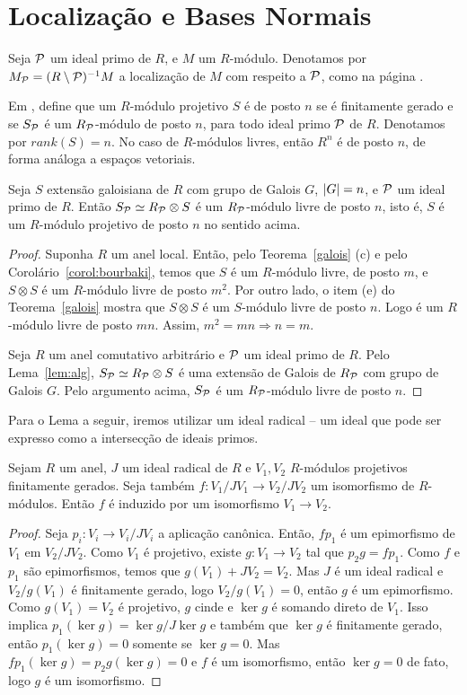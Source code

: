 \section{Localização e Bases Normais} \label{sec:local}
Seja $\mathcal{P}$ um ideal primo de $R$, e $M$ um $R$-módulo. Denotamos por $M_{\mathcal{P}} = (R\setminus \mathcal{P})^{-1}M$ a localização de $M$ com respeito a $\mathcal{P}$, como na página \pageref{localiza}. \par 
Em \cite{bourbaki}, \citeauthor{bourbaki} define que um $R$-módulo projetivo $S$ é de posto $n$ se é finitamente gerado e se $S_{\mathcal{P}}$ é um $R_{\mathcal{P}}$-módulo de posto $n$, para todo ideal primo $\mathcal{P}$ de $R$. Denotamos por $rank(S)=n$. No caso de $R$-módulos livres, então $R^n$ é de posto $n$, de forma análoga a espaços vetoriais.
\begin{lemma} \label{lem:local}
Seja $S$ extensão galoisiana de $R$ com grupo de Galois $G$, $\left| G \right|=n$, e $\mathcal{P}$ um ideal primo de $R$. Então $S_{\mathcal{P}} \simeq R_{\mathcal{P}} \otimes S$ é um $R_{\mathcal{P}}$-módulo livre de posto $n$, isto é, $S$ é um $R$-módulo projetivo de posto $n$ no sentido acima.
\begin{proof}
Suponha $R$ um anel local. Então, pelo Teorema~\ref{galois} (c) e pelo Corolário~\ref{corol:bourbaki}, temos que $S$ é um $R$-módulo livre, de posto $m$, e $S\otimes S$ é um $R$-módulo livre de posto $m^2$.
Por outro lado, o item (e) do Teorema~\ref{galois} mostra que $S\otimes S$ é um $S$-módulo livre de posto $n$. Logo é um $R$-módulo livre de posto $mn$. Assim, $m^2=mn \Rightarrow n=m$. \par
Seja $R$ um anel comutativo arbitrário e $\mathcal{P}$ um ideal primo de $R$. Pelo Lema~\ref{lem:alg}, $S_{\mathcal{P}} \simeq R_{\mathcal{P}} \otimes S$ é uma extensão de Galois de $R_{\mathcal{P}}$ com grupo de Galois $G$. Pelo argumento acima, $S_{\mathcal{P}}$ é um $R_{\mathcal{P}}$-módulo livre de posto $n$.
\end{proof}
\end{lemma}
Para o Lema a seguir, iremos utilizar um ideal radical -- um ideal que pode ser expresso como a intersecção de ideais primos.
\begin{lemma}\label{lem:isoindu}\cite[Lemma 3.14.]{zelinsky}
Sejam $R$ um anel, $J$ um ideal radical de $R$ e $V_1, V_2$ $R$-módulos projetivos finitamente gerados. Seja também $f: V_1/JV_1 \rightarrow V_2/JV_2$ um isomorfismo de $R$-módulos. Então $f$ é induzido por um isomorfismo $V_1\rightarrow V_2$.
\begin{proof}
Seja $p_i: V_i \rightarrow V_i/JV_i$ a aplicação canônica. Então, $fp_1$ é um epimorfismo de $V_1$ em $V_2/JV_2$. Como $V_1$ é projetivo, existe $g: V_1 \rightarrow V_2$ tal que $p_2 g = fp_1$. Como $f$ e $p_1$ são epimorfismos, temos que $g(V_1)+JV_2=V_2$. Mas $J$ é um ideal radical e $V_2/g(V_1)$ é finitamente gerado, logo $V_2/g(V_1) =0$, então $g$ é um epimorfismo. Como $g(V_1)=V_2$ é projetivo, $g$ cinde e $\ker{g}$ é somando direto de $V_1$. Isso implica $p_1(\ker{g}) = \ker{g}/J\ker{g}$ e também que $\ker{g}$ é finitamente gerado, então $p_1(\ker{g})=0$ somente se $\ker{g}=0$. Mas $fp_1(\ker{g})= p_2g(\ker{g}) =0$ e $f$ é um isomorfismo, então $\ker{g}=0$ de fato, logo $g$ é um isomorfismo.
\end{proof}
\end{lemma}

